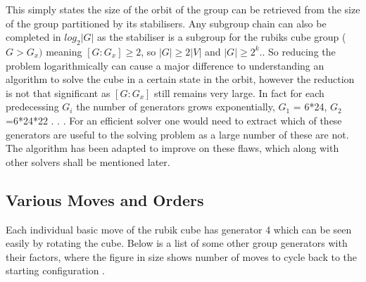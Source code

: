 \documentclass{article}
\newcounter{lem}[section]\setcounter{lem}{0}
\begin{document}
This simply states the size of the orbit of the group can be retrieved from the size of the group partitioned by its stabilisers. Any subgroup chain can also be completed in $log_{2}|G|$ as the stabiliser is a subgroup for the rubiks cube group ($G>G_{x})$ meaning $[G:G_{x}]\geq 2$, so $|G|\geq2|V|$ and $|G|\geq 2^{k}.$\cite{OrbStab}. So reducing the problem logarithmically can cause a major difference to understanding an algorithm to solve the cube in a certain state in the orbit, however the reduction is not that significant as $[G:G_{x}]$ still remains very large. In fact for each predecessing $G_{i}$ the number of generators grows exponentially, $G_{1}$ = 6*24, $G_{2}$=6*24*22 . . . For an efficient solver one would need to extract which of these generators are useful to the solving problem as a large number of these are not. The algorithm has been adapted to improve on these flaws, which along with other solvers shall be mentioned later.

\subsection{Various Moves and Orders}

Each individual basic move of the rubik cube has generator 4 which can be seen easily by rotating the cube. Below is a list of some other group generators with their factors, where the figure in size shows number of moves to cycle back to the starting configuration \cite{gentable}.
\end{document}
